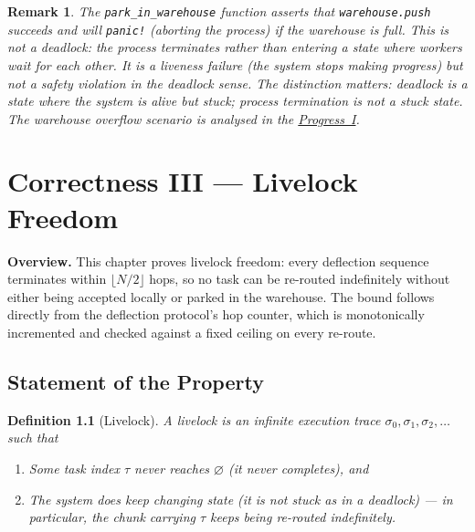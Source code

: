 \documentclass[11pt,a4paper]{report}
\newtheorem{definition}{Definition}[section]
\newtheorem{remark}{Remark}[section]
\newcommand{\code}[1]{\texttt{#1}}
\begin{document}
\begin{remark}
The \code{park\_in\_warehouse} function asserts that
\code{warehouse.push} succeeds and will \code{panic!} (aborting the
process) if the warehouse is full.  This is \emph{not} a deadlock:
the process terminates rather than entering a state where workers wait
for each other.  It is a \emph{liveness failure} (the system stops
making progress) but not a safety violation in the deadlock sense.
The distinction matters: deadlock is a state where the system is
\emph{alive but stuck}; process termination is not a stuck state.
The warehouse overflow scenario is analysed in the \hyperref[chap:bounded_wait]{Progress~I}.
\end{remark}


\chapter{Correctness III --- Livelock Freedom}
\label{chap:livelock}

\bigskip
\noindent\textbf{Overview.}
This chapter proves livelock freedom: every deflection sequence
terminates within $\lfloor N/2\rfloor$ hops, so no task can be
re-routed indefinitely without either being accepted locally or
parked in the warehouse. The bound follows directly from the
deflection protocol's hop counter, which is monotonically incremented
and checked against a fixed ceiling on every re-route.


\section{Statement of the Property}

\begin{definition}[Livelock]
\label{def:livelock}
A \emph{livelock} is an infinite execution trace
$\sigma_0, \sigma_1, \sigma_2, \ldots$ such that
\begin{enumerate}
  \item Some task index $\tau$ never reaches $\varnothing$
        (it never completes), and
  \item The system \emph{does} keep changing state (it is not stuck
        as in a deadlock) --- in particular, the chunk carrying $\tau$
        keeps being re-routed indefinitely.
\end{enumerate}
\end{definition}
\end{document}
